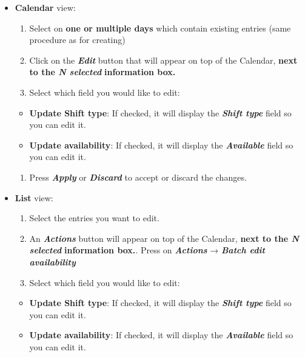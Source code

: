 \documentclass[
  paper=a4,
  ,captions=tableheading
]{scrartcl}
\providecommand{\tightlist}{%
  \setlength{\itemsep}{0pt}\setlength{\parskip}{0pt}}
\begin{document}
\begin{itemize}
\tightlist
\item
  \textbf{Calendar} view:

  \begin{enumerate}
  \def\labelenumi{\arabic{enumi}.}
  \tightlist
  \item
    Select on \textbf{one or multiple days} which contain existing
    entries (same procedure as for creating)
  \item
    Click on the \textbf{\emph{Edit}} button that will appear on top of
    the Calendar, \textbf{next to the \emph{N selected}}
    \textbf{information box.}
  \item
    Select which field you would like to edit:
  \end{enumerate}

  \begin{itemize}
  \tightlist
  \item
    \textbf{Update Shift type}: If checked, it will display the
    \textbf{\emph{Shift type}} field so you can edit it.
  \item
    \textbf{Update availability}: If checked, it will display the
    \textbf{\emph{Available}} field so you can edit it.
  \end{itemize}

  \begin{enumerate}
  \def\labelenumi{\arabic{enumi}.}
  \setcounter{enumi}{3}
  \tightlist
  \item
    Press \textbf{\emph{Apply}} or \textbf{\emph{Discard}} to accept or
    discard the changes.
  \end{enumerate}
\item
  \textbf{List} view:

  \begin{enumerate}
  \def\labelenumi{\arabic{enumi}.}
  \tightlist
  \item
    Select the entries you want to edit.
  \item
    An \textbf{\emph{Actions}} button will appear on top of the
    Calendar, \textbf{next to the \emph{N selected}} \textbf{information
    box.}. Press on \textbf{\emph{Actions}} → \textbf{\emph{Batch edit
    availability}}
  \item
    Select which field you would like to edit:
  \end{enumerate}

  \begin{itemize}
  \tightlist
  \item
    \textbf{Update Shift type}: If checked, it will display the
    \textbf{\emph{Shift type}} field so you can edit it.
  \item
    \textbf{Update availability}: If checked, it will display the
    \textbf{\emph{Available}} field so you can edit it.
  \end{itemize}


\end{itemize}
\end{document}
